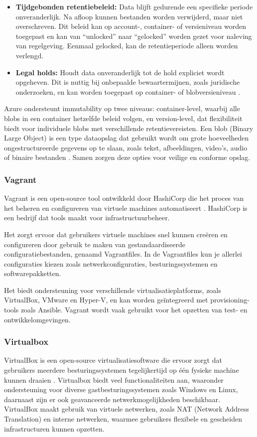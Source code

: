 \begin{itemize}[leftmargin=1cm]
    \item \textbf{Tijdgebonden retentiebeleid:} Data blijft gedurende een specifieke periode onveranderlijk. Na afloop kunnen bestanden worden verwijderd, maar niet overschreven. Dit beleid kan op account-, container- of versieniveau worden toegepast en kan van ``unlocked'' naar ``gelocked'' worden gezet voor naleving van regelgeving. Eenmaal gelocked, kan de retentieperiode alleen worden verlengd.
    \item \textbf{Legal holds:} Houdt data onveranderlijk tot de hold expliciet wordt opgeheven. Dit is nuttig bij onbepaalde bewaartermijnen, zoals juridische onderzoeken, en kan worden toegepast op container- of blobversieniveau \autocite{Estabrook2024}.
\end{itemize}
Azure ondersteunt immutability op twee niveaus: container-level, waarbij alle blobs in een container hetzelfde beleid volgen, en version-level, dat flexibiliteit biedt voor individuele blobs met verschillende retentievereisten. Een blob (Binary Large Object) is een type dataopslag dat gebruikt wordt om grote hoeveelheden ongestructureerde gegevens op te slaan, zoals tekst, afbeeldingen, video's, audio of binaire bestanden \autocite{Kemp2007}. Samen zorgen deze opties voor veilige en conforme opslag.



\subsubsection{Vagrant}
Vagrant is een open-source tool ontwikkeld door HashiCorp die het proces van het beheren en configureren van virtuele machines automatiseert \autocite{Hashicorp}. HashiCorp is een bedrijf dat tools maakt voor infrastructuurbeheer. 

Het zorgt ervoor dat gebruikers virtuele machines snel kunnen creëren en configureren door gebruik te maken van gestandaardiseerde configuratiebestanden, genaamd Vagrantfiles. In de Vagrantfiles kun je allerlei configuraties kiezen zoals netwerkconfiguraties, besturingssystemen en softwarepakketten. 

Het biedt ondersteuning voor verschillende virtualisatieplatforms, zoals VirtualBox, VMware en Hyper-V, en kan worden geïntegreerd met provisioning-tools zoals Ansible. Vagrant wordt vaak gebruikt voor het opzetten van test- en ontwikkelomgevingen.

\subsubsection{Virtualbox}
VirtualBox is een open-source virtualisatiesoftware die ervoor zorgt dat gebruikers meerdere besturingssystemen tegelijkertijd op één fysieke machine kunnen draaien \autocite{Oracle}. Virtualbox biedt veel functionaliteiten aan, waaronder ondersteuning voor diverse gastbesturingssystemen zoals Windows en Linux, daarnaast zijn er ook geavanceerde netwerkmogelijkheden beschikbaar. VirtualBox maakt gebruik van virtuele netwerken, zoals NAT (Network Address Translation) en interne netwerken, waarmee gebruikers flexibele en gescheiden infrastructuren kunnen opzetten. 

